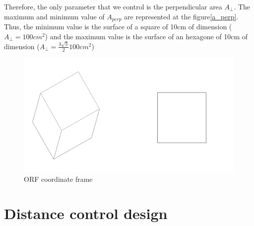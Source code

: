 Therefore, the only parameter that we control is the perpendicular area $A_{\perp}$. The maximum and minimum value of $A_{perp}$ are represented at the figure\ref{a_perp}. Thus, the minimum value is the surface of a square of 10cm of dimension ($A_{\perp} = 100cm^2$) and the maximum value is the surface of an hexagone of 10cm of dimension ($A_{\perp} = \frac{3\sqrt{3}}{2} 100cm^2$)
\begin{figure}[H]
	\centering
	\includegraphics[width=0.4\linewidth]{figures/a_prep}
	\caption{ORF coordinate frame}
	\label{fig:OFR}
\end{figure}
\chapter{Distance control design}